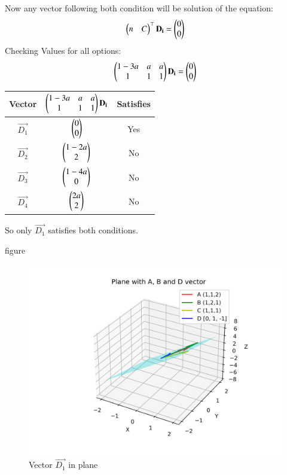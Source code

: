 \documentclass{beamer}
\begin{document}
\begin{frame}

Now any vector following both condition will be solution of the equation:
\begin{align}
    \begin{pmatrix} n & C\end{pmatrix}^\top\mathbf{D_i}=\begin{pmatrix}0\\0\end{pmatrix}
\end{align}
Checking Values for all options:
\begin{align}
    \begin{pmatrix}1-3a & a & a \\ 1 & 1 &1\end{pmatrix}\mathbf{D_i}=\begin{pmatrix}0 \\ 0\end{pmatrix}
\end{align}
\end{frame}
\begin{frame}
\begin{center}
\begin{tabular}{|c|c|c|}
\hline
Vector & $ \begin{pmatrix}1-3a & a & a \\ 1 & 1 &1\end{pmatrix}\mathbf{D_i}$ & Satisfies\\ \hline
$\vec{D_1}$ & $\begin{pmatrix}0\\0\end{pmatrix}$ & Yes \\ \hline
$\vec{D_2}$ & $\begin{pmatrix}1-2a\\2\end{pmatrix}$  & No  \\ \hline
$\vec{D_3}$ & $\begin{pmatrix}1-4a\\0\end{pmatrix}$ & No \\ \hline
$\vec{D_4}$ & $\begin{pmatrix}2a\\2\end{pmatrix}$  & No  \\ \hline
\end{tabular}
\end{center}

So only $\vec{D_1}$ satisfies both conditions.




\end{frame}
\begin{frame}{figure}
\begin{figure}[H]
    \centering
    \includegraphics[width=0.6\linewidth]{figures/plane_1.png}
    \caption{Vector $\vec{D_1}$ in plane}
\end{figure}
\end{frame}
\end{document}
